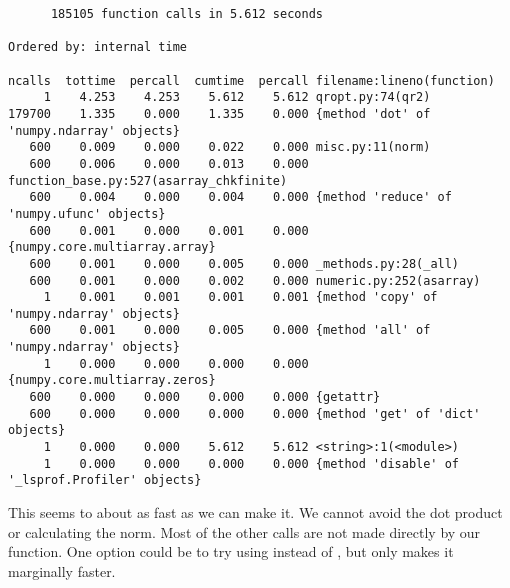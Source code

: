 {\scriptsize
\begin{verbatim}
      185105 function calls in 5.612 seconds

Ordered by: internal time

ncalls  tottime  percall  cumtime  percall filename:lineno(function)
     1    4.253    4.253    5.612    5.612 qropt.py:74(qr2)
179700    1.335    0.000    1.335    0.000 {method 'dot' of 'numpy.ndarray' objects}
   600    0.009    0.000    0.022    0.000 misc.py:11(norm)
   600    0.006    0.000    0.013    0.000 function_base.py:527(asarray_chkfinite)
   600    0.004    0.000    0.004    0.000 {method 'reduce' of 'numpy.ufunc' objects}
   600    0.001    0.000    0.001    0.000 {numpy.core.multiarray.array}
   600    0.001    0.000    0.005    0.000 _methods.py:28(_all)
   600    0.001    0.000    0.002    0.000 numeric.py:252(asarray)
     1    0.001    0.001    0.001    0.001 {method 'copy' of 'numpy.ndarray' objects}
   600    0.001    0.000    0.005    0.000 {method 'all' of 'numpy.ndarray' objects}
     1    0.000    0.000    0.000    0.000 {numpy.core.multiarray.zeros}
   600    0.000    0.000    0.000    0.000 {getattr}
   600    0.000    0.000    0.000    0.000 {method 'get' of 'dict' objects}
     1    0.000    0.000    5.612    5.612 <string>:1(<module>)
     1    0.000    0.000    0.000    0.000 {method 'disable' of '_lsprof.Profiler' objects}
\end{verbatim}
}
This seems to about as fast as we can make it.  We cannot avoid the dot product or calculating the norm.
Most of the other calls are not made directly by our function.  
One option could be to try using  instead of , but only makes it marginally faster.

